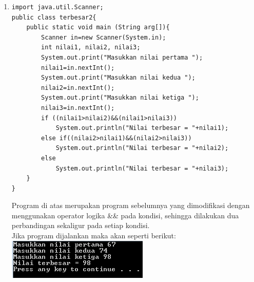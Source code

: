 \documentclass[a4paper,12pt]{article}
\begin{document}
\begin{enumerate}[label=\textbf{\arabic* .}]
        \item 
            \begin{lstlisting}[frame=single]
import java.util.Scanner;
public class terbesar2{
    public static void main (String arg[]){
        Scanner in=new Scanner(System.in);
        int nilai1, nilai2, nilai3;
        System.out.print("Masukkan nilai pertama ");
        nilai1=in.nextInt();
        System.out.print("Masukkan nilai kedua ");
        nilai2=in.nextInt();
        System.out.print("Masukkan nilai ketiga ");
        nilai3=in.nextInt();
        if ((nilai1>nilai2)&&(nilai1>nilai3))
            System.out.println("Nilai terbesar = "+nilai1);
        else if((nilai2>nilai1)&&(nilai2>nilai3))
            System.out.println("Nilai terbesar = "+nilai2);
        else
            System.out.println("Nilai terbesar = "+nilai3);
    }
}               
            \end{lstlisting}
            Program di atas merupakan program sebelumnya yang dimodifikasi dengan menggunakan operator logika \&\& pada kondisi, sehingga dilakukan dua
            perbandingan sekaligur pada setiap kondisi.\\
            Jika program dijalankan maka akan seperti berikut:\\
            \includegraphics{05b.PNG}

            \newpage


\end{enumerate}
\end{document}
